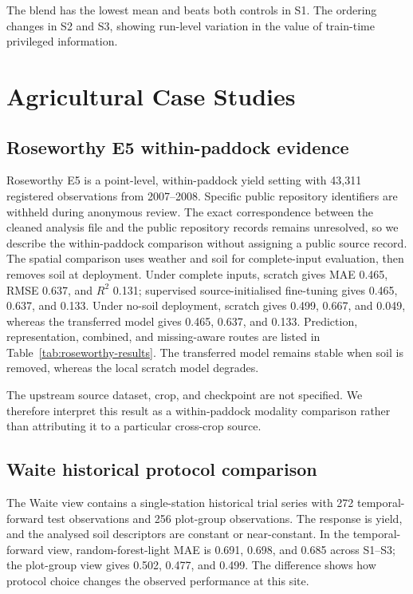 \documentclass[runningheads]{venue/lncs/llncs}
\begin{document}
The blend has the lowest mean and beats both controls in S1. The ordering changes in S2 and S3, showing run-level variation in the value of train-time privileged information.

\section{Agricultural Case Studies}\label{sec:secondary-cases}

\subsection{Roseworthy E5 within-paddock evidence}

Roseworthy E5 is a point-level, within-paddock yield setting with 43,311 registered observations from 2007--2008. Specific public repository identifiers are withheld during anonymous review. The exact correspondence between the cleaned analysis file and the public repository records remains unresolved, so we describe the within-paddock comparison without assigning a public source record. The spatial comparison uses weather and soil for complete-input evaluation, then removes soil at deployment. Under complete inputs, scratch gives MAE 0.465, RMSE 0.637, and $R^2$ 0.131; supervised source-initialised fine-tuning gives 0.465, 0.637, and 0.133. Under no-soil deployment, scratch gives 0.499, 0.667, and 0.049, whereas the transferred model gives 0.465, 0.637, and 0.133. Prediction, representation, combined, and missing-aware routes are listed in Table~\ref{tab:roseworthy-results}. The transferred model remains stable when soil is removed, whereas the local scratch model degrades.

The upstream source dataset, crop, and checkpoint are not specified. We therefore interpret this result as a within-paddock modality comparison rather than attributing it to a particular cross-crop source.


\subsection{Waite historical protocol comparison}

The Waite view contains a single-station historical trial series with 272 temporal-forward test observations and 256 plot-group observations. The response is yield, and the analysed soil descriptors are constant or near-constant. In the temporal-forward view, random-forest-light MAE is 0.691, 0.698, and 0.685 across S1--S3; the plot-group view gives 0.502, 0.477, and 0.499. The difference shows how protocol choice changes the observed performance at this site.
\end{document}
